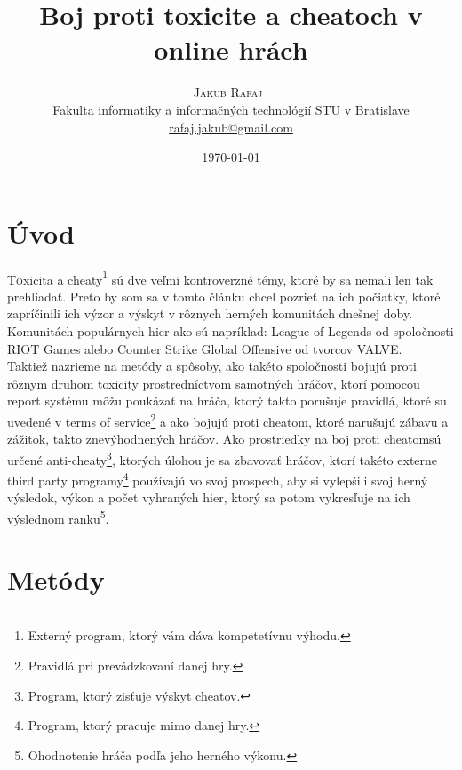 \documentclass[twoside,twocolumn]{article}
\title{Boj proti toxicite a cheatoch v online hrách} %
\author{%
\textsc{Jakub Rafaj}\
\\[1ex]
\normalsize Fakulta informatiky a informačných technológií STU v Bratislave  \\%
\normalsize \href{mailto:rafaj.jakub@gmail.com}{rafaj.jakub@gmail.com} %
}
\date{\today} %
\begin{document}
\maketitle

\tableofcontents
\section{Úvod}

\lettrine[nindent=0em,lines=3]{T}oxicita a cheaty\footnote[1]{Externý program, ktorý vám dáva kompetetívnu výhodu.} sú dve veľmi kontroverzné témy, ktoré by sa nemali len tak prehliadať. Preto by som sa v tomto článku chcel pozrieť na ich počiatky, ktoré zapríčinili ich výzor a výskyt v rôznych herných komunitách dnešnej doby. Komunitách populárnych hier ako sú napríklad: League of Legends od spoločnosti RIOT Games alebo Counter Strike Global Offensive od tvorcov VALVE.\\
Taktiež nazrieme na metódy a spôsoby, ako takéto spoločnosti bojujú proti rôznym druhom toxicity prostredníctvom samotných hráčov, ktorí pomocou report systému môžu poukázať na hráča, ktorý takto porušuje pravidlá, ktoré su uvedené v terms of service\footnote[2]{Pravidlá pri prevádzkovaní danej hry.} a ako bojujú proti cheatom\footnotemark[1], ktoré narušujú zábavu a zážitok, takto znevýhodnených hráčov. Ako prostriedky na boj proti cheatom\footnotemark[1] sú určené anti-cheaty\footnote[3]{Program, ktorý zisťuje výskyt cheatov.}, ktorých úlohou je sa zbavovať hráčov, ktorí takéto externe third party programy\footnote[4]{Program, ktorý pracuje mimo danej hry.} používajú vo svoj prospech, aby si vylepšili svoj herný výsledok, výkon a počet vyhraných hier, ktorý sa potom vykresľuje na ich výslednom ranku\footnote[5]{Ohodnotenie hráča podľa jeho herného výkonu.}.


\section{Metódy}
\end{document}

